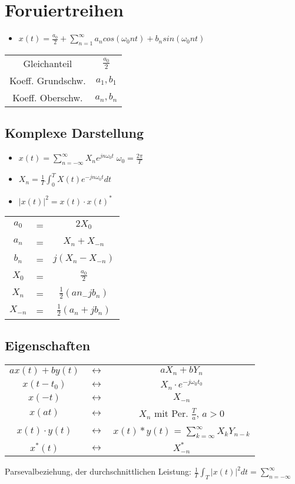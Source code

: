 \documentclass{article}
\begin{document}
\section{Foruiertreihen}
\begin{itemize}
\item $x(t) = \frac{a_0}{2} + \sum_{n=1}^\infty a_n cos(\omega_0nt)+b_nsin(\omega_0nt)$
\end{itemize}
\begin{tabular}{ c c}
 Gleichanteil & $\frac{a_0}{2}$\\
 Koeff. Grundschw. & $a_1,b_1$ \\
 Koeff. Oberschw. & $a_n, b_n$ \\
 \end{tabular}

\subsection{Komplexe Darstellung}
\begin{itemize}
\item $x(t) = \sum_{n = - \infty}^\infty X_ne^{jn\omega_0t} \; \omega_0 = \frac{2\pi}{T}$
\item $X_n = \frac{1}{T} \int_0^T X(t) e^{-jn\omega_0t}dt$
\item $|x(t)|^2 = x(t)\cdot x(t)^*$
\end{itemize}
\begin{tabular}{c  c c}
$a_0$ &=& $2X_0$ \\
 $a_n$&= & $X_n +X_{-n}$ \\
 $b_n$&= & $j(X_n-X_{-n})$ \\
 $X_0$&= & $\frac{a_0}{2}$ \\
 $X_n$ &=& $\frac{1}{2}(an_-jb_n)$ \\
 $X_{-n}$ &=& $\frac{1}{2}(a_n+jb_n)$ \\
 \end{tabular}


\subsection{Eigenschaften}
\begin{tabular}{c c c}
$ax(t) + by(t)$ &$\leftrightarrow$& $aX_n+bY_n$ \\
$x(t-t_0)$ &$\leftrightarrow$& $X_n\cdot e^{-j\omega_0t_0}$ \\
$x(-t)$ &$\leftrightarrow$& $X_{-n}$ \\
$x(at)$ &$\leftrightarrow$& $X_n$ mit Per. $\frac{T}{a}$, $a > 0$ \\
$x(t)\cdot y(t)$ &$\leftrightarrow$& $x(t)*y(t)$  = $\sum_{k=\infty}^\infty X_kY_{n-k}$\\
$x^*(t)$ & $\leftrightarrow$ & $X^*_{-n}$\\
\end{tabular} \newline
Parsevalbeziehung, der durchschnittlichen Leistung: $\frac{1}{T} \int_T |x(t)|^2 dt = \sum_{n=-\infty}^\infty$
\end{document}
